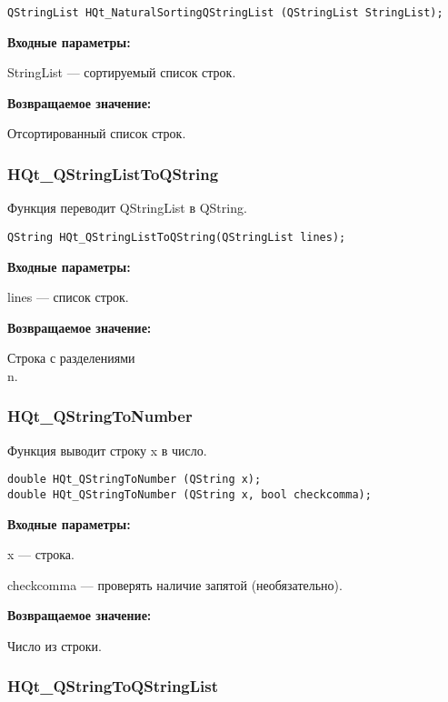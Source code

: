 \documentclass[a4paper,12pt]{article}
\begin{document}
\begin{lstlisting}[label=code_syntax_HQt_NaturalSortingQStringList,caption=Синтаксис]
QStringList HQt_NaturalSortingQStringList (QStringList StringList);
\end{lstlisting}

\textbf{Входные параметры:}

StringList --- сортируемый список строк.

\textbf{Возвращаемое значение:}
 
Отсортированный список строк.


\subsubsection{HQt\_QStringListToQString}\label{HQt_QStringListToQString}

Функция переводит QStringList в QString.


\begin{lstlisting}[label=code_syntax_HQt_QStringListToQString,caption=Синтаксис]
QString HQt_QStringListToQString(QStringList lines);
\end{lstlisting}

\textbf{Входные параметры:}
 
lines --- список строк.

\textbf{Возвращаемое значение:}

Строка с разделениями \\n.


\subsubsection{HQt\_QStringToNumber}\label{HQt_QStringToNumber}

Функция выводит строку x в число.


\begin{lstlisting}[label=code_syntax_HQt_QStringToNumber,caption=Синтаксис]
double HQt_QStringToNumber (QString x);
double HQt_QStringToNumber (QString x, bool checkcomma);
\end{lstlisting}

\textbf{Входные параметры:}

x --- строка.

checkcomma --- проверять наличие запятой (необязательно).

\textbf{Возвращаемое значение:}
 
Число из строки.


\subsubsection{HQt\_QStringToQStringList}\label{HQt_QStringToQStringList}
\end{document}
